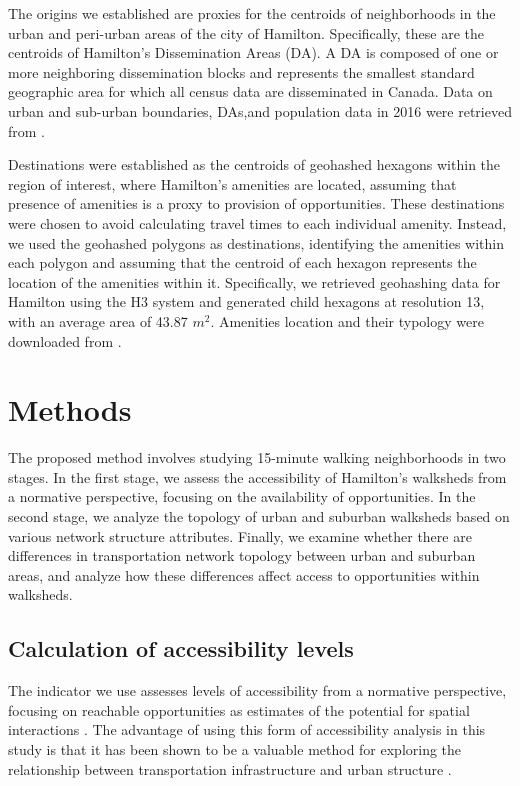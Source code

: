 \documentclass[preprint, 3p,
authoryear]{elsarticle} %
\begin{document}
The origins we established are proxies for the centroids of
neighborhoods in the urban and peri-urban areas of the city of Hamilton.
Specifically, these are the centroids of Hamilton's Dissemination Areas
(DA). A DA is composed of one or more neighboring dissemination blocks
and represents the smallest standard geographic area for which all
census data are disseminated in Canada. Data on urban and sub-urban
boundaries, DAs,and population data in 2016 were retrieved from
\citet{HamiltonData2023}.

Destinations were established as the centroids of geohashed hexagons
within the region of interest, where Hamilton's amenities are located,
assuming that presence of amenities is a proxy to provision of
opportunities. These destinations were chosen to avoid calculating
travel times to each individual amenity. Instead, we used the geohashed
polygons as destinations, identifying the amenities within each polygon
and assuming that the centroid of each hexagon represents the location
of the amenities within it. Specifically, we retrieved geohashing data
for Hamilton using the H3 system \citet{h3Package} and generated child
hexagons at resolution 13, with an average area of 43.87 \(m^2\).
Amenities location and their typology were downloaded from
\citet{OpenStreetMap2023}.

\section{Methods}\label{methods}

The proposed method involves studying 15-minute walking neighborhoods in
two stages. In the first stage, we assess the accessibility of
Hamilton's walksheds from a normative perspective, focusing on the
availability of opportunities. In the second stage, we analyze the
topology of urban and suburban walksheds based on various network
structure attributes. Finally, we examine whether there are differences
in transportation network topology between urban and suburban areas, and
analyze how these differences affect access to opportunities within
walksheds.

\subsection{Calculation of accessibility
levels}\label{calculation-of-accessibility-levels}

The indicator we use assesses levels of accessibility from a normative
perspective, focusing on reachable opportunities as estimates of the
potential for spatial interactions \citet{Hansen1959}. The advantage of
using this form of accessibility analysis in this study is that it has
been shown to be a valuable method for exploring the relationship
between transportation infrastructure and urban structure
\citet{Handy1997}.
\end{document}
